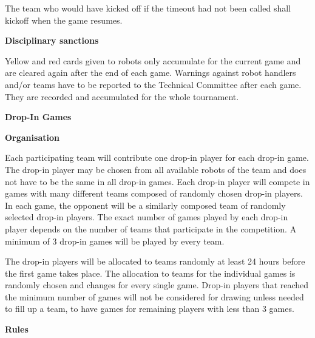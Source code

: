 The team who would have kicked off if the timeout had not been called shall kickoff when the game resumes.

\bigskip

{\bfseries Disciplinary sanctions}

Yellow and red cards given to robots only accumulate for the current game and are cleared again after the end of each game. Warnings against robot handlers and/or teams have to be reported to the Technical Committee after each game. They are recorded and accumulated for the whole tournament. 




\bigskip

{\bfseries Drop-In Games}

\headlinebox

{\bfseries Organisation}

Each participating team will contribute one drop-in player for each drop-in game. The drop-in player may be chosen from all available robots of the team and does not have to be the same in all drop-in games. Each drop-in player will compete in games with many different teams composed of randomly chosen drop-in players. In each game, the opponent will  be a similarly composed team of randomly selected drop-in players. The exact number of games played by each drop-in player depends on the number of teams that participate in the competition. A minimum of 3 drop-in games will be played by every team.

\bigskip

The drop-in players will be allocated to teams randomly at least 24 hours before the first game takes place. The allocation to teams for the individual games is randomly chosen and changes for every single game. Drop-in players that reached the minimum number of games will not be considered for drawing unless needed to fill up a team, to have games for remaining players with less than 3 games.


\bigskip

{\bfseries Rules}

